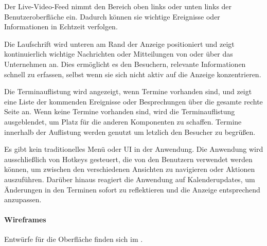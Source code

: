 Der Live-Video-Feed nimmt den Bereich oben links oder unten links der Benutzeroberfläche ein.
Dadurch können sie wichtige Ereignisse oder Informationen in Echtzeit verfolgen.

Die Laufschrift wird unteren am Rand der Anzeige positioniert und zeigt kontinuierlich wichtige Nachrichten oder Mitteilungen von oder über das Unternehmen an.
Dies ermöglicht es den Besuchern, relevante Informationen schnell zu erfassen, selbst wenn sie sich nicht aktiv auf die Anzeige konzentrieren.

Die Terminauflistung wird angezeigt, wenn Termine vorhanden sind, und zeigt eine Liste der kommenden Ereignisse oder Besprechungen über die gesamte rechte Seite an.
Wenn keine Termine vorhanden sind, wird die Terminauflistung ausgeblendet, um Platz für die anderen Komponenten zu schaffen.
Termine innerhalb der Auflistung werden genutzt um letzlich den Besucher zu begrüßen.

Es gibt kein traditionelles Menü oder \ac{UI} in der Anwendung.
Die Anwendung wird ausschließlich von Hotkeys gesteuert, die von den Benutzern verwendet werden können, um zwischen den verschiedenen Ansichten zu navigieren oder Aktionen auszuführen.
Darüber hinaus reagiert die Anwendung auf Kalenderupdates, um Änderungen in den Terminen sofort zu reflektieren und die Anzeige entsprechend anzupassen.

\paragraph{Wireframes}
Entwürfe für die Oberfläche finden sich im .


%
%
%


